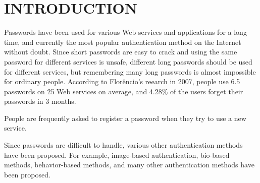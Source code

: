 \documentclass{article}
\begin{document}




\section{INTRODUCTION}

% 

Passwords have been used for various Web services and applications
for a long time, and currently the most popular authentication method on the Internet
without doubt.
Since short passwords are easy to crack and
using the same password for different services is unsafe,
different long passwords should be used for different services,
but remembering many long passwords is almost impossible for ordinary people.
%
According to Flor\^{e}ncio's reearch in 2007,
people use 6.5 passwords on 25 Web services on average, and
4.28\% of the users forget their passwords in 3 months\cite{Florencio:2007:LSW:1242572.1242661}.


People are frequently asked to register a password when
they try to use a new service.

%   

Since passwords are difficult to handle,
various other authentication methods have been proposed.
For example,
image-based authentication\cite{Biddle:2012:GPL:2333112.2333114}\cite{小池英樹:2006-05-15}\cite{GraphicalPasswords}, 
bio-based methods\cite{},
behavior-based methods\cite{},
and many other authentication methods have been proposed.
\end{document}
